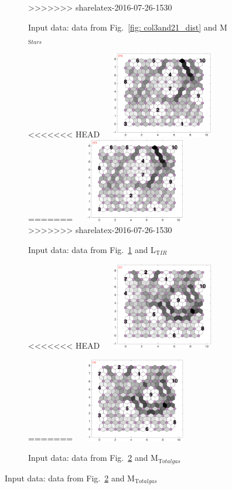 \begin{figure}
\begin{subfigure}[b]{0.25\textwidth}
>>>>>>> sharelatex-2016-07-26-1530
        \caption{Input data: data from Fig.~\ref{fig: col3and21_dist} and M$_{{\mathrm Stars}}$}
        \label{fig: col3and22_dist}
    \end{subfigure}
            \hfill
    \begin{subfigure}[b]{0.25\textwidth}
        \centering
<<<<<<< HEAD
        \includegraphics[width=54mm, height=38mm]{../../images0.01/M31/2D/diff_dimension/combine_2D_data_between_cols3and23.png}
=======
        \includegraphics[width=54mm, height=37mm]{../../images0.01/M31/2D/diff_dimension/combine_2D_data_between_cols3and23.png}
>>>>>>> sharelatex-2016-07-26-1530
        \caption{Input data: data from Fig.~\ref{fig: col3and22_dist} and L$_{{\mathrm TIR}}$}
        \label{fig: col3and23_dist}
    \end{subfigure}
            \hfill
    \begin{subfigure}[b]{0.25\textwidth}
        \centering
<<<<<<< HEAD
        \includegraphics[width=54mm, height=38mm]{../../images0.01/M31/2D/diff_dimension/combine_2D_data_between_cols3and24.png}
        \caption{Input data: data from Fig.~\ref{fig: col3and23_dist} and M$_{{\mathrm Total gas}}$}
=======
        \includegraphics[width=54mm, height=37mm]{../../images0.01/M31/2D/diff_dimension/combine_2D_data_between_cols3and24.png}

\end{subfigure}
\end{figure}
